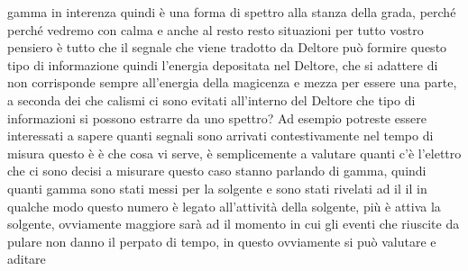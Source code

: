 gamma in interenza quindi è una forma di spettro alla stanza della grada, perché perché vedremo con calma e anche al resto resto situazioni per tutto vostro pensiero è tutto che il segnale che viene tradotto da Deltore può formire questo tipo di informazione quindi l'energia depositata nel Deltore, che si adattere di non corrisponde sempre all'energia della magicenza e mezza per essere una parte, a seconda dei che calismi ci sono evitati all'interno del Deltore che tipo di informazioni si possono estrarre da uno spettro? Ad esempio potreste essere interessati a sapere quanti segnali sono arrivati contestivamente nel tempo di misura questo è è che cosa vi serve, è semplicemente a valutare quanti c'è l'elettro che ci sono decisi a misurare questo caso stanno parlando di gamma, quindi quanti gamma sono stati messi per la solgente e sono stati rivelati ad il il in qualche modo questo numero è legato all'attività della solgente, più è attiva la solgente, ovviamente maggiore sarà ad il momento in cui gli eventi che riuscite da pulare non danno il perpato di tempo, in questo ovviamente si può valutare e aditare

